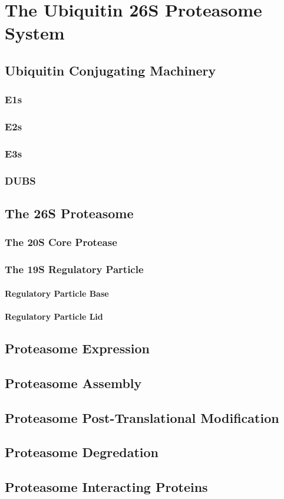 \chapter{The Ubiquitin 26S Proteasome System}
\section{Ubiquitin Conjugating Machinery}
	\subsection{E1s}
	\subsection{E2s}
	\subsection{E3s}
	\subsection{DUBS}
\section{The 26S Proteasome}
	\subsection{The 20S Core Protease}
	\subsection{The 19S Regulatory Particle}
		\subsubsection{Regulatory Particle Base}
		\subsubsection{Regulatory Particle Lid}
\section{Proteasome Expression}
\section{Proteasome Assembly}
\section{Proteasome Post-Translational Modification}
\section{Proteasome Degredation}
\section{Proteasome Interacting Proteins}
